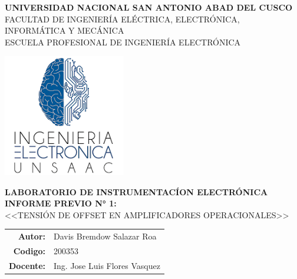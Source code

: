 \begin{titlepage}

  \begin{center}
    \Large{\textbf{UNIVERSIDAD NACIONAL SAN ANTONIO ABAD DEL CUSCO}} \\ 
    \vspace{0.4cm}
    \large{FACULTAD DE INGENIER\'IA EL\'ECTRICA, ELECTR\'ONICA, INFORM\'ATICA Y MEC\'ANICA}\ \\ 
    \vspace{0.1cm} 
    \large{ESCUELA PROFESIONAL DE INGENIER\'IA ELECTR\'ONICA}\ \\ 
	
    \vspace{1.0cm}    
    
    \includegraphics[width=0.4\textwidth]{images/LI-UNSAAC.png} \\


    \vspace{0.8cm}

    \large{\textbf{\textsc{LABORATORIO DE INSTRUMENTAC\'ION ELECTR\'ONICA}}} \\
    \vspace{0.2cm}
    \large{\textbf{\textsc{INFORME PREVIO N° 1:}}} \\ 
    
    
    \vspace{0.5cm}
    \large{ \textsc{<<TENSI\'ON DE OFFSET EN AMPLIFICADORES OPERACIONALES>>}} \\
    \vspace{1.0cm}
    
    \begin{table}[H]
	\centering
	\begin{tabular}{rl}
	\large{\textbf{Autor:}}   & \large{Davis Bremdow Salazar Roa}  \\
        \large{\textbf{Codigo:}}   & \large{200353}  \\
        \large{\textbf{Docente:}} & \large{Ing. Jose Luis Flores Vasquez}
	\end{tabular}
	\end{table}


\end{center}
\end{titlepage}
